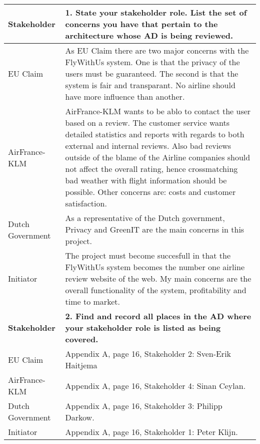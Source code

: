 \begin{longtable}{| l | p{13cm} |}
  \hline
  \textbf{Stakeholder} & \textbf{1. State your stakeholder role. List the set of concerns you have that pertain to the architecture whose AD is being reviewed.} \\
  \hline
  EU Claim & As EU Claim there are two major concerns with the FlyWithUs system. One is that the privacy of the users must be guaranteed. The second is that the system is fair and transparant. No airline should have more influence than another. \\
  \hline
  AirFrance-KLM & AirFrance-KLM wants to be ablo to contact the user based on a review. The customer service wants detailed statistics and reports with regards to both external and internal reviews. Also bad reviews outside of the blame of the Airline companies should not affect the overall rating, hence crossmatching bad weather with flight information should be possible. Other concerns are: costs and customer satisfaction. \\
  \hline
  Dutch Government &As a representative of the Dutch government, Privacy and GreenIT are the main concerns in this project. \\
  \hline
  Initiator & The project must become succesfull in that the FlyWithUs system becomes the  number one airline review website of the web.  My main concerns are the overall functionality of the system, profitability and time to market. \\
  \hline

  \hline
  \textbf{Stakeholder} & \textbf{2. Find and record all places in the AD where your stakeholder role is listed as being covered.} \\
  \hline
  EU Claim & Appendix A, page 16, Stakeholder 2: Sven-Erik Haitjema  \\
  \hline
  AirFrance-KLM & Appendix A, page 16, Stakeholder 4: Sinan Ceylan.  \\
  \hline
  Dutch Government & Appendix A, page 16, Stakeholder 3: Philipp Darkow. \\
  \hline
  Initiator & Appendix A, page 16, Stakeholder 1: Peter Klijn. \\
  \hline


\end{longtable}
